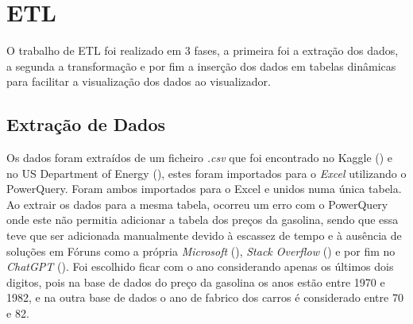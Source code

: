 \documentclass[a4paper]{article}
\begin{document}
\section{ETL}\label{etl}
O trabalho de ETL foi realizado em 3 fases, a primeira foi a extração dos dados, 
a segunda a transformação e por fim a inserção dos dados em tabelas dinâmicas para 
facilitar a visualização dos dados ao visualizador.
\newpage
\subsection{Extração de Dados}
Os dados foram extraídos de um ficheiro \textit{.csv} que foi encontrado no Kaggle (\cite{kaggle}) e no US Department of Energy (\cite{usdoe}), 
estes foram importados para o \textit{Excel} utilizando o PowerQuery. Foram ambos importados para o Excel e unidos numa única tabela.
\\
Ao extrair os dados para a mesma tabela, ocorreu um erro com o PowerQuery onde este não permitia adicionar
a tabela dos preços da gasolina, sendo que essa teve que ser adicionada manualmente devido à escassez de tempo e à ausência de soluções em Fóruns como a própria
\textit{Microsoft} (\cite{microsofthelp}), \textit{Stack Overflow} (\cite{stackoverflow}) e por fim no \textit{ChatGPT} (\cite{chatgpt}). Foi escolhido ficar com o ano
considerando apenas os últimos dois digitos, pois na base de dados do preço da gasolina os anos estão entre 1970 e 1982, e na outra base de dados o ano de fabrico dos carros
é considerado entre 70 e 82.

\end{document}

